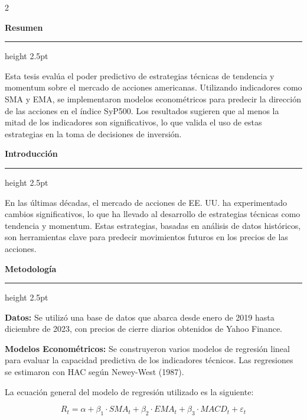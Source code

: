 \documentclass[a0,portrait]{a0poster}
\newcommand{\customsection}[1]{
    \begin{center}
        \vspace{1cm} %
        \color{black}
        \textbf{\Huge #1}
        \color{miRojo}
        \vspace{.5cm} %
        \hrule height 2.5pt  %
        \vspace{.5cm} %
    \end{center}
}
\begin{document}
\vspace{2cm}
\normalsize %
\begin{multicols}{2}

    \customsection{Resumen}
    \par
     Esta tesis evalúa el poder predictivo de estrategias técnicas de tendencia y momentum sobre el mercado de acciones americanas. Utilizando indicadores como SMA y EMA, se implementaron modelos econométricos para predecir la dirección de las acciones en el índice SyP500. Los resultados sugieren que al menos la mitad de los indicadores son significativos, lo que valida el uso de estas estrategias en la toma de decisiones de inversión.
    \customsection{Introducción}
    \par
     En las últimas décadas, el mercado de acciones de EE. UU. ha experimentado cambios significativos, lo que ha llevado al desarrollo de estrategias técnicas como tendencia y momentum. Estas estrategias, basadas en análisis de datos históricos, son herramientas clave para predecir movimientos futuros en los precios de las acciones.
    \customsection{Metodología}
    \par
    \textbf{Datos:} Se utilizó una base de datos que abarca desde enero de 2019 hasta diciembre de 2023, con precios de cierre diarios obtenidos de Yahoo Finance. 
    \par
    \textbf{Modelos Econométricos:} Se construyeron varios modelos de regresión lineal para evaluar la capacidad predictiva de los indicadores técnicos. Las regresiones se estimaron con HAC según Newey-West (1987).
    
    La ecuación general del modelo de regresión utilizado es la siguiente:

    \begin{equation}
        R_t = \alpha + \beta_1 \cdot SMA_t + \beta_2 \cdot EMA_t + \beta_3 \cdot MACD_t + \varepsilon_t
    \end{equation}
    

\end{multicols}
\end{document}

